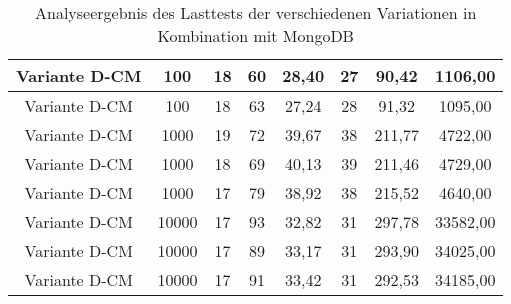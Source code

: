 \begin{landscape}
\begin{table}[h!]
\begin{tabular}{ |c|c|c|c|c|c|c|c|}
		\hline
		Variante D-CM & 100 & 18 & 60 & 28,40 & 27 & 90,42 & 1106,00 \\
		\hline
		Variante D-CM & 100 & 18 & 63 & 27,24 & 28 & 91,32 & 1095,00 \\
		\hline
		Variante D-CM & 1000 & 19 & 72 & 39,67 & 38 & 211,77 & 4722,00 \\
		\hline
		Variante D-CM & 1000 & 18 & 69 & 40,13 & 39 & 211,46 & 4729,00 \\
		\hline
		Variante D-CM & 1000 & 17 & 79 & 38,92 & 38 & 215,52 & 4640,00 \\
		\hline
		Variante D-CM & 10000 & 17 & 93 & 32,82 & 31 & 297,78 & 33582,00 \\
		\hline
		Variante D-CM & 10000 & 17 & 89 & 33,17 & 31 & 293,90 & 34025,00 \\
		\hline
		Variante D-CM & 10000 & 17 & 91 & 33,42 & 31 & 292,53 & 34185,00 \\
		\hline
	\end{tabular}
	\caption{Analyseergebnis des Lasttests der verschiedenen Variationen in Kombination mit MongoDB}
	\label{fig:performance-mongo}
\end{table}
\end{landscape}


